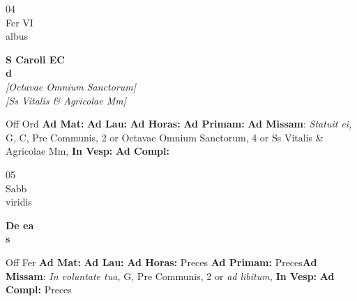 \documentclass[10pt, openany]{book}
\begin{document}
    \begin{center}
        \begin{minipage}{3.5in}
            \vspace{2em}
            \begin{minipage}{0.5in}
                {\Huge 04} \\
                {\normalsize Fer VI} \\
                {\normalsize albus}
            \end{minipage}
            \begin{minipage}{3.0in}
                \textbf{ \large S Caroli EC \\
                \textnormal{\normalsize d}} \\ \textit{[Octavae Omnium Sanctorum]} \\ \textit{[Ss Vitalis \& Agricolae Mm]} \\ 
            \end{minipage}
            \begin{justify}Off Ord
                \textbf{Ad Mat: }
                \textbf{Ad Lau: }
                \textbf{Ad Horas: }
                \textbf{Ad Primam: }\textbf{Ad Missam}: \textit{Statuit ei,} G, C, Pre Communis, 2 or Octavae Omnium Sanctorum, 4 or Ss Vitalis \& Agricolae Mm,  
                \textbf{In Vesp: }
                \textbf{Ad Compl: }
            \end{justify}
        \end{minipage}
    \end{center}

    \begin{center}
        \begin{minipage}{3.5in}
            \vspace{2em}
            \begin{minipage}{0.5in}
                {\Huge 05} \\
                {\normalsize Sabb} \\
                {\normalsize viridis}
            \end{minipage}
            \begin{minipage}{3.0in}
                \textbf{ \large De ea \\
                \textnormal{\normalsize s}} \\ 
            \end{minipage}
            \begin{justify}Off Fer
                \textbf{Ad Mat: }
                \textbf{Ad Lau: }
                \textbf{Ad Horas: }Preces
                \textbf{Ad Primam: }Preces\textbf{Ad Missam}: \textit{In voluntate tua,} G, Pre Communis, 2 or \textit{ad libitum,}  
                \textbf{In Vesp: }
                \textbf{Ad Compl: }Preces
            \end{justify}
        \end{minipage}
    \end{center}
\end{document}
